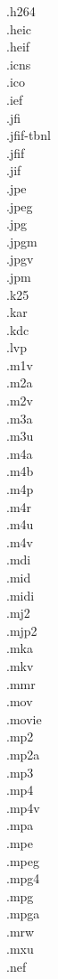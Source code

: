 .h264\\
.heic\\
.heif\\
.icns\\
.ico\\
.ief\\
.jfi\\
.jfif-tbnl\\
.jfif\\
.jif\\
.jpe\\
.jpeg\\
.jpg\\
.jpgm\\
.jpgv\\
.jpm\\
.k25\\
.kar\\
.kdc\\
.lvp\\
.m1v\\
.m2a\\
.m2v\\
.m3a\\
.m3u\\
.m4a\\
.m4b\\
.m4p\\
.m4r\\
.m4u\\
.m4v\\
.mdi\\
.mid\\
.midi\\
.mj2\\
.mjp2\\
.mka\\
.mkv\\
.mmr\\
.mov\\
.movie\\
.mp2\\
.mp2a\\
.mp3\\
.mp4\\
.mp4v\\
.mpa\\
.mpe\\
.mpeg\\
.mpg4\\
.mpg\\
.mpga\\
.mrw\\
.mxu\\
.nef\\
